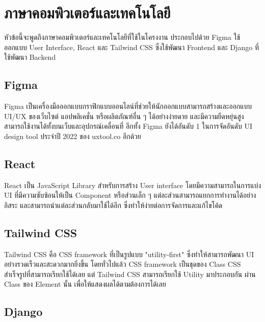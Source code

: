 \documentclass[12pt,oneside,openright,a4paper]{cpe-thai-project}
\begin{document}

\pagebreak
\section{ภาษาคอมพิวเตอร์และเทคโนโลยี}

\hspace{1cm}
หัวข้อนี้จะพูดถึงภาษาคอมพิวเตอร์และเทคโนโลยีที่ใช้ในโครงงาน ประกอบไปด้วย Figma ใช้ออกแบบ User Interface,
React
และ Tailwind CSS
ซึ่งใช้พัฒนา Frontend และ Django ที่ใช้พัฒนา Backend

\subsection{Figma}

\hspace{1cm}
Figma \cite{Figma} เป็นเครื่องมือออกแบบกราฟิกแบบออนไลน์ที่ช่วยให้นักออกแบบสามารถสร้างและออกแบบ UI/UX ของเว็บไซต์
แอปพลิเคชั่น หรือผลิตภัณฑ์อื่น ๆ ได้อย่างง่ายดาย และมีความยืดหยุ่นสูง สามารถใช้งานได้ทั้งบนเว็บและอุปกรณ์เคลื่อนที่
อีกทั้ง Figma ยังได้อันดับ 1 ในการจัดอันดับ UI design tool ประจำปี 2022 ของ uxtool.co อีกด้วย

\subsection{React}

\hspace{1cm}
React \cite{React} เป็น JavaScript Library สำหรับการสร้าง User interface โดยมีความสามารถในการแบ่ง UI ที่มีความซับซ้อนให้เป็น Component หรือส่วนเล็ก ๆ
แต่ละส่วนสามารถแยกการทำงานได้อย่างอิสระ และสามารถนำแต่ละส่วนกลับมาใช้ได้อีก ซึ่งทำให้ง่ายต่อการจัดการและแก้ไขโค้ด

\subsection{Tailwind CSS}

\hspace{1cm}
Tailwind CSS \cite{Tailwind} คือ CSS framework ที่เป็นรูปแบบ "utility-first" ซึ่งทำให้สามารถพัฒนา UI อย่างรวดเร็วและสะดวกมากยิ่งขึ้น
โดยทั่วไปแล้ว CSS framework เป็นชุดของ Class CSS สำเร็จรูปที่สามารถเรียกใช้ได้เลย แต่ Tailwind CSS สามารถเรียกใช้ Utility มาประกอบกัน
ผ่าน Class ของ Element นั้น เพื่อให้แสดงผลได้ตามต้องการได้เลย

\subsection{Django}
\end{document}
